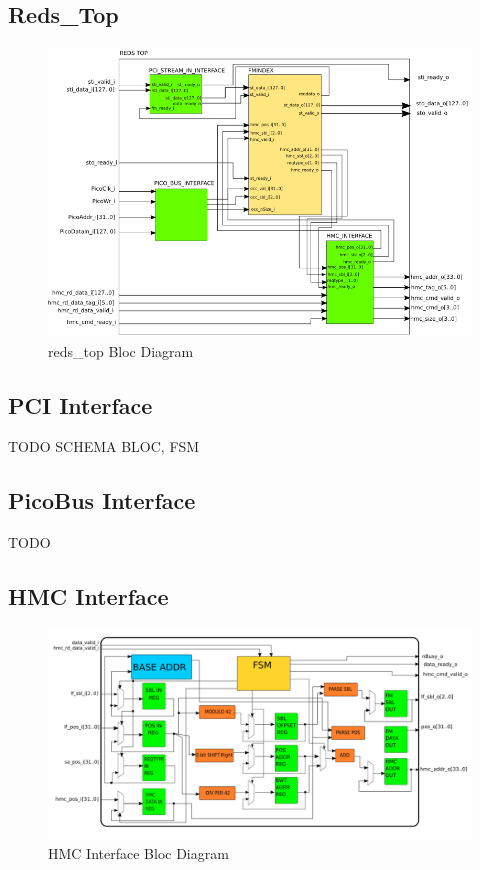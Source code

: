 \subsection{Reds\_Top}
\begin{figure}[H]
    \centering
    \includegraphics[scale = 0.55]{Figures/REDS_TOP_DIAG.png}
    \caption{reds\_top Bloc Diagram}
    \label{fig:reds_top_diag}
\end{figure}

\subsection{PCI Interface}
TODO
SCHEMA BLOC, FSM

\subsection{PicoBus Interface}
TODO
\subsection{HMC Interface}

\begin{figure}[H]
    \centering
    \hspace*{-20mm}\includegraphics[scale = 0.45]{Figures/HMC_DIAG.png}
    \caption{HMC Interface Bloc Diagram}
    \label{fig:seqschema}
\end{figure}

